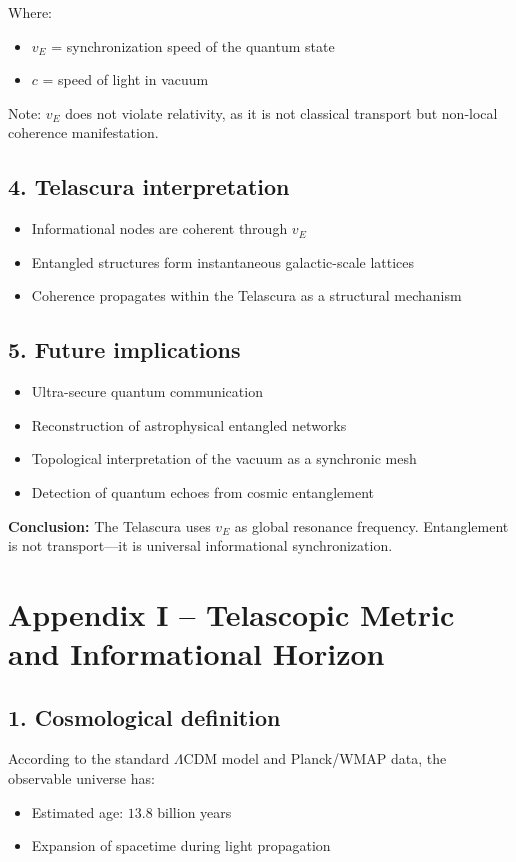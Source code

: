 \documentclass[12pt]{article}
\begin{document}
Where:
\begin{itemize}
    \item $v_E$ = synchronization speed of the quantum state
    \item $c$ = speed of light in vacuum
\end{itemize}

Note: $v_E$ does not violate relativity, as it is not classical transport but non-local coherence manifestation.

\subsection*{4. Telascura interpretation}
\begin{itemize}
    \item Informational nodes are coherent through $v_E$
    \item Entangled structures form instantaneous galactic-scale lattices
    \item Coherence propagates within the Telascura as a structural mechanism
\end{itemize}

\subsection*{5. Future implications}
\begin{itemize}
    \item Ultra-secure quantum communication
    \item Reconstruction of astrophysical entangled networks
    \item Topological interpretation of the vacuum as a synchronic mesh
    \item Detection of quantum echoes from cosmic entanglement
\end{itemize}

\textbf{Conclusion:} The Telascura uses $v_E$ as global resonance frequency. Entanglement is not transport—it is universal informational synchronization.
\section*{Appendix I – Telascopic Metric and Informational Horizon}

\subsection*{1. Cosmological definition}
According to the standard $\Lambda$CDM model and Planck/WMAP data, the observable universe has:
\begin{itemize}
    \item Estimated age: $13.8$ billion years
    \item Expansion of spacetime during light propagation
\end{itemize}
\end{document}
